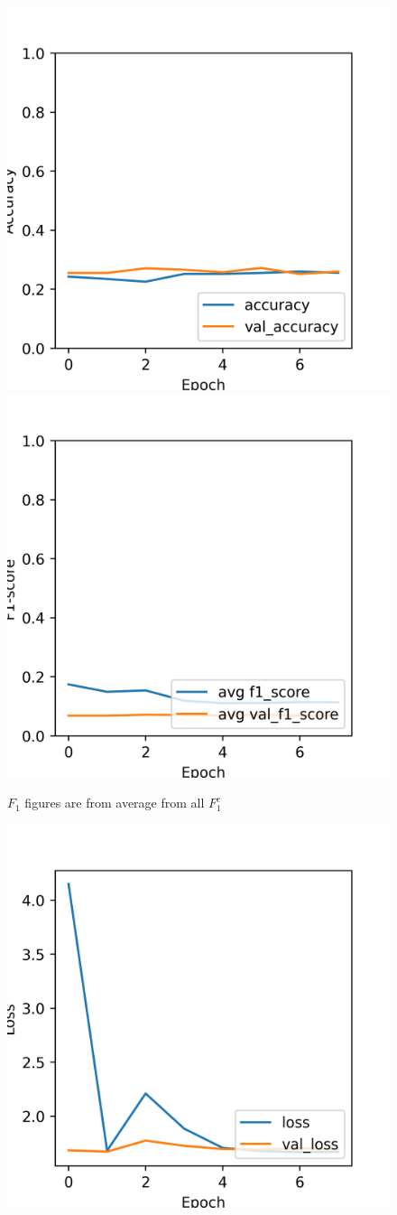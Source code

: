 \begin{figure}[H]
	\centering
	\includegraphics[width=.5\textwidth]{assets/results/preMELD.vgg/vgg16_finetune/learning_history-acc.png}\hfill
	\includegraphics[width=.5\textwidth]{assets/results/preMELD.vgg/vgg16_finetune/learning_history-f1_score.png}\hfill
	\caption{$F_1$ figures are from average from all $F_1^c$}
	\label{fig:figure12}
\end{figure}

\begin{figure}[H]
	\centering
	\includegraphics[width=.5\textwidth]{assets/results/preMELD.vgg/vgg16_finetune/learning_history-loss.png}
	
	\label{fig:figure11}
\end{figure}

